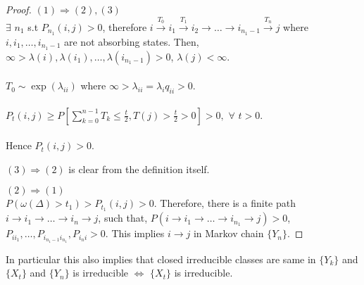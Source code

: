 \documentclass[all-lectures.tex]{subfiles}
\begin{document}
\begin{proof}{$(1)	\Rightarrow (2), (3)$}\\
	
$\exists$ $n_1$ s.t $P_{n_1}(i,j) > 0$,  therefore $i \xrightarrow{T_0} i_1 \xrightarrow{T_1} i_2 \rightarrow \dots \rightarrow i_{n_1-1} \xrightarrow{T_n} j$ where $i, i_1, \dots, i_{n_1-1}$ are not absorbing states. Then,
 $\infty > \lambda(i),\lambda(i_1),\dots,\lambda(i_{n_1-1})>0$, $\lambda(j) < \infty$.\\\\
$T_0 \sim \exp(\lambda_{ii})$ where $\infty > \lambda_{ii} = \lambda_i q_{ii} > 0$.\\\\
$P_t(i,j) \ge P[\sum_{k=0}^{n-1} T_k \le \frac{t}{2} , T(j) > \frac{t}{2} > 0] >0,$ \quad $\forall$ $t>0$.\\\\
Hence $P_t(i,j) >0$.

{$(3)	\Rightarrow (2)$} is clear from the definition itself.

{$(2)	\Rightarrow (1)$}\\
	
$P(\omega(\Delta) > t_1) > P_{t_1}(i,j)  > 0$. Therefore, there is a finite path $i \to i_1 \to \dots \to i_n \to j$,
such that,
$P(i \to i_1 \to \dots \to i_{n_1} \to j) > 0$, $P_{ii_1}, \dots, P_{i_{n_1-1}i_{n_1}} , P_{i_ni} >0$.
This implies $i \to j$ in Markov chain $\{Y_n\}$.
\end{proof}
In particular this also implies that closed irreducible classes are same in $\{Y_k\}$ and $\{X_t\}$ and
$\{Y_n\}$ is irreducible $\Leftrightarrow$ $\{X_t\}$ is irreducible.
\end{document}
